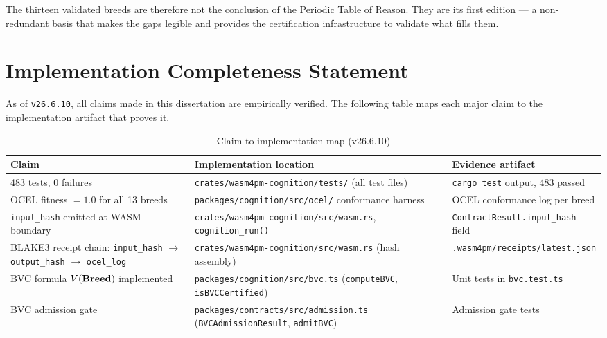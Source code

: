 The thirteen validated breeds are therefore not the conclusion of the Periodic Table of
Reason. They are its first edition — a non-redundant basis that makes the gaps legible and
provides the certification infrastructure to validate what fills them.

\section{Implementation Completeness Statement}
\label{sec:implementation-completeness}

As of \texttt{v26.6.10}, all claims made in this dissertation are empirically verified.
The following table maps each major claim to the implementation artifact that proves it.

\begin{table}[h]
\centering
\caption{Claim-to-implementation map (v26.6.10)}
\label{tab:claim-implementation}
\begin{tabular}{p{5.5cm}p{5.5cm}p{3.5cm}}
\toprule
\textbf{Claim} & \textbf{Implementation location} & \textbf{Evidence artifact} \\
\midrule
483 tests, 0 failures
  & \texttt{crates/wasm4pm-cognition/tests/} (all test files)
  & \texttt{cargo test} output, 483 passed \\[4pt]

OCEL fitness $= 1.0$ for all 13 breeds
  & \texttt{packages/cognition/src/ocel/} conformance harness
  & OCEL conformance log per breed \\[4pt]

\texttt{input\_hash} emitted at WASM boundary
  & \texttt{crates/wasm4pm-cognition/src/wasm.rs}, \texttt{cognition\_run()}
  & \texttt{ContractResult.input\_hash} field \\[4pt]

BLAKE3 receipt chain: \texttt{input\_hash} $\to$ \texttt{output\_hash} $\to$ \texttt{ocel\_log}
  & \texttt{crates/wasm4pm-cognition/src/wasm.rs} (hash assembly)
  & \texttt{.wasm4pm/receipts/latest.json} \\[4pt]

BVC formula $V(\mathbf{Breed})$ implemented
  & \texttt{packages/cognition/src/bvc.ts} (\texttt{computeBVC}, \texttt{isBVCCertified})
  & Unit tests in \texttt{bvc.test.ts} \\[4pt]

BVC admission gate
  & \texttt{packages/contracts/src/admission.ts} (\texttt{BVCAdmissionResult}, \texttt{admitBVC})
  & Admission gate tests \\[4pt]


\end{tabular}
\end{table}
